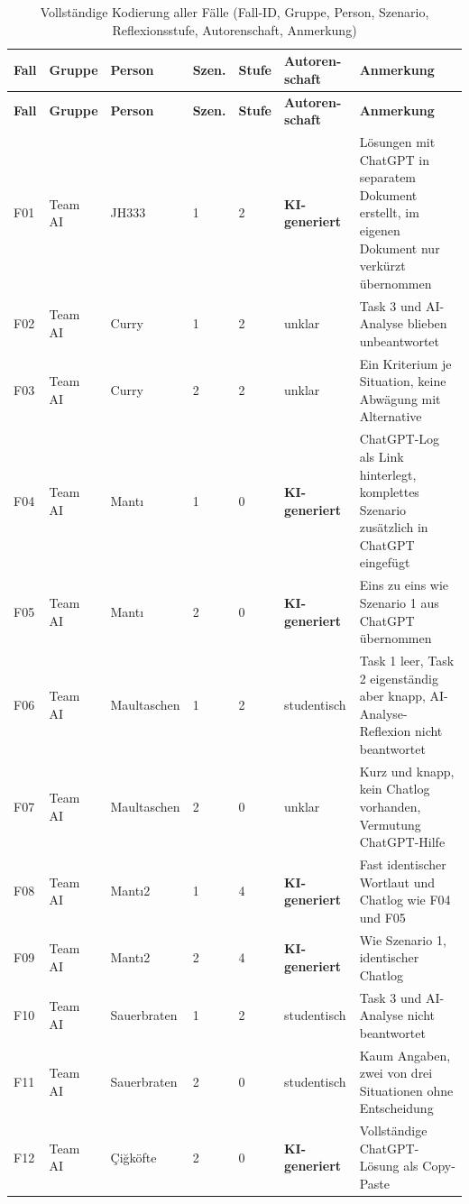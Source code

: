 \small
\begingroup
\setlength{\tabcolsep}{4pt}
\begin{longtable}{p{0.7cm} p{2cm} p{2cm} p{0.8cm} p{0.7cm} p{3cm} p{4.5cm}}
	\caption{Vollständige Kodierung aller Fälle (Fall-ID, Gruppe, Person, Szenario, Reflexionsstufe, Autorenschaft, Anmerkung)}
	\label{tab:kodierungstabelle-voll} \\
	\toprule
	\textbf{Fall} & \textbf{Gruppe} & \textbf{Person} & \textbf{Szen.} & \textbf{Stufe} & \textbf{Autoren-\allowbreak schaft} & \textbf{Anmerkung} \\
	\midrule
	\endfirsthead
	\toprule
	\textbf{Fall} & \textbf{Gruppe} & \textbf{Person} & \textbf{Szen.} & \textbf{Stufe} & \textbf{Autoren-\allowbreak schaft} & \textbf{Anmerkung} \\
	\midrule
	\endhead
	\bottomrule
	\endfoot
	F01 & Team AI & JH333 & 1 & 2 & \textbf{KI-generiert} & Lösungen mit ChatGPT in separatem Dokument erstellt, im eigenen Dokument nur verkürzt übernommen \\
	F02 & Team AI & Curry & 1 & 2 & unklar & Task 3 und AI-Analyse blieben unbeantwortet \\
	F03 & Team AI & Curry & 2 & 2 & unklar & Ein Kriterium je Situation, keine Abwägung mit Alternative \\
	F04 & Team AI & Mant{\i} & 1 & 0 & \textbf{KI-generiert} & ChatGPT-Log als Link hinterlegt, komplettes Szenario zusätzlich in ChatGPT eingefügt \\
	F05 & Team AI & Mant{\i} & 2 & 0 & \textbf{KI-generiert} & Eins zu eins wie Szenario 1 aus ChatGPT übernommen \\
	F06 & Team AI & Maultaschen & 1 & 2 & studentisch & Task 1 leer, Task 2 eigenständig aber knapp, AI-Analyse-Reflexion nicht beantwortet \\
	F07 & Team AI & Maultaschen & 2 & 0 & unklar & Kurz und knapp, kein Chatlog vorhanden, Vermutung ChatGPT-Hilfe \\
	F08 & Team AI & Mant{\i}2 & 1 & 4 & \textbf{KI-generiert} & Fast identischer Wortlaut und Chatlog wie F04 und F05 \\
	F09 & Team AI & Mant{\i}2 & 2 & 4 & \textbf{KI-generiert} & Wie Szenario 1, identischer Chatlog \\
	F10 & Team AI & Sauerbraten & 1 & 2 & studentisch & Task 3 und AI-Analyse nicht beantwortet \\
	F11 & Team AI & Sauerbraten & 2 & 0 & studentisch & Kaum Angaben, zwei von drei Situationen ohne Entscheidung \\
	F12 & Team AI & {\c C}i{\u g}köfte & 2 & 0 & \textbf{KI-generiert} & Vollständige ChatGPT-Lösung als Copy-Paste \\

\end{longtable}
